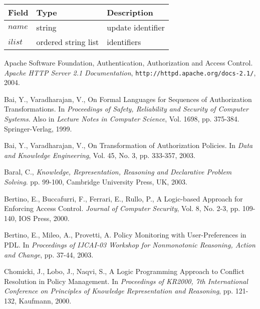 \documentclass[global,twocolumn,final]{svjour}
\newenvironment{vquote}
  {\begin{list}{}{\leftmargin 1em}\item[]}
  {\end{list}}
\begin{document}
      \begin{vquote}
        \begin{tabular}[t]{|l|l|l|}
          \hline
          \textbf{Field} & \textbf{Type} & \textbf{Description} \\
          \hline
          $name$ & string & update identifier \\
          \hline
          $ilist$ & ordered string list & identifiers \\
          \hline
        \end{tabular}
      \end{vquote}

  \begin{thebibliography}{5}
      Apache Software Foundation,
      Authentication, Authorization and Access Control.
      {\em Apache HTTP Server 2.1 Documentation},
      {\tt \scriptsize http://httpd.apache.org/docs-2.1/}, 2004.

      Bai, Y., Varadharajan, V.,
      On Formal Languages for Sequences of Authorization Transformations.
      In {\em Proceedings of Safety, Reliability and Security of Computer
      Systems}. Also in {\em Lecture Notes in Computer Science},
      Vol. 1698, pp. 375-384. Springer-Verlag, 1999.

      Bai, Y., Varadharajan, V.,
      On Transformation of Authorization Policies.
      In {\em Data and Knowledge Engineering},
      Vol. 45, No. 3, pp. 333-357, 2003.

      Baral, C.,
      {\em Knowledge, Representation, Reasoning and Declarative Problem
      Solving}.
      pp. 99-100, Cambridge University Press, UK, 2003.

      Bertino, E., Buccafurri, F., Ferrari, E., Rullo, P.,
      A Logic-based Approach for Enforcing Access Control.
      {\em Journal of Computer Security},
      Vol. 8, No. 2-3, pp. 109-140, IOS Press, 2000.

      Bertino, E., Mileo, A., Provetti, A.
      Policy Monitoring with User-Preferences in PDL.
      In {\em Proceedings of IJCAI-03 Workshop for Nonmonotonic Reasoning,
      Action and Change},
      pp. 37-44, 2003.

      Chomicki, J., Lobo, J., Naqvi, S.,
      A Logic Programming Approach to Conflict Resolution in Policy Management.
      In {\em Proceedings of KR2000, 7th International Conference on Principles
      of Knowledge Representation and Reasoning},
      pp. 121-132, Kaufmann, 2000.


\end{thebibliography}
\end{document}

